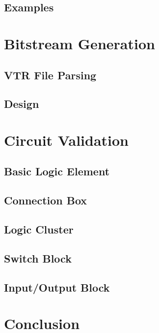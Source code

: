 \documentclass[12pt]{article}
\begin{document}
\subsection{Examples}

\newpage
\section{Bitstream Generation}

\subsection{VTR File Parsing}

\subsection{Design}

\newpage
\section{Circuit Validation}

\subsection{Basic Logic Element}

\subsection{Connection Box}

\subsection{Logic Cluster}

\subsection{Switch Block}

\subsection{Input/Output Block}

\newpage
\section{Conclusion}

\newpage
{}

\end{document}
